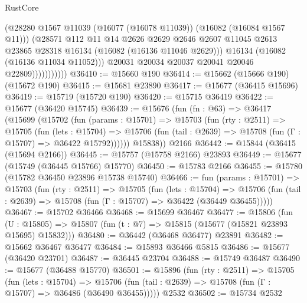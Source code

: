 \begin{lexlean}{RustCore}
\begin{coremodule}
                            (@28280
                              @1567
                              @11039
                              (@16077 (@16078 @11039))
                              (@16082 (@16084 @1567 @11)))
                            (@28571
                              @112
                              @11
                              @14
                              @2626
                              @2629
                              @2646
                              @2607
                              @11045
                              @2613
                              @23865
                              @28318
                              @16134
                              (@16082 (@16136 @11046 @2629)))
                            @16134
                            (@16082 (@16136 @11034 @11052)))
                          @20031
                          @20034
                          @20037
                          @20041
                          @20046
                          @22809)))))))))))
@36410 := @15660 @190
@36414 := @15662 (@15666 @190) (@15672 @190)
@36415 := @15681 @23890
@36417 := @15677 (@36415 @15696)
@36419 := @15719 (@15720 @190)
@36420 := @15715 @36419
@36422 := @15677 (@36420 @15745)
@36439 := @15676
    (fun (fn : @63) =>
    @36417
      (@15699
        (@15702
          (fun (params : @15701) =>
          @15703
            (fun (rty : @2511) =>
            @15705
              (fun (lets : @15704) =>
              @15706 (fun (tail : @2639) => @15708 (fun (Γ : @15707) => @36422 @15792))))))
        @15838))
    @2166
@36442 := @15844 (@36415 (@15694 @2166))
@36445 := @15757 (@15758 @2166) @23893
@36449 := @15677 (@15749 (@36445 @15766) @15770)
@36450 := @15783 @2166
@36455 := @15780 (@15782 @36450 @23896 @15738 @15740)
@36466 := fun (params : @15701) =>
  @15703
    (fun (rty : @2511) =>
    @15705
      (fun (lets : @15704) =>
      @15706 (fun (tail : @2639) => @15708 (fun (Γ : @15707) => @36422 (@36449 @36455)))))
@36467 := @15702 @36466
@36468 := @15699 @36467
@36477 := @15806
    (fun (U : @15805) => @15807 (fun (t : @7) => @15815 (@15677 (@15821 @23893 @15695) @15832)))
@36480 := @36442 (@36468 @36477) @23891
@36482 := @15662 @36467 @36477
@36484 := @15893 @36466 @5815
@36486 := @15677 (@36420 @23701)
@36487 := @36445 @23704
@36488 := @15749 @36487
@36490 := @15677 (@36488 @15770)
@36501 := @15896
    (fun (rty : @2511) =>
    @15705
      (fun (lets : @15704) =>
      @15706 (fun (tail : @2639) => @15708 (fun (Γ : @15707) => @36486 (@36490 @36455)))))
    @2532
@36502 := @15734 @2532

\end{coremodule}
\end{lexlean}
